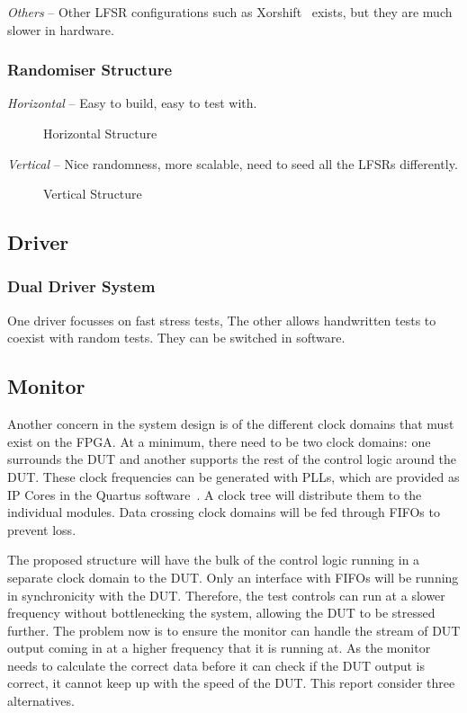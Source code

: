 \textit{Others} --
Other LFSR configurations such as Xorshift~\cite{Marsaglia1} exists, but they are much slower in hardware.

\subsubsection{Randomiser Structure}

\textit{Horizontal} --
Easy to build, easy to test with.

\begin{figure}[ht]
  \centering
  
  \caption{Horizontal Structure}
  \label{HoriLFSR}
\end{figure}

\textit{Vertical} --
Nice randomness, more scalable, need to seed all the LFSRs differently.

\begin{figure}[ht]
  \centering
  
  \caption{Vertical Structure}
  \label{VertLFSR}
\end{figure}

\subsection{Driver}
\subsubsection{Dual Driver System}
One driver focusses on fast stress tests, The other allows handwritten tests to coexist with random tests.
They can be switched in software.

\subsection{Monitor}

Another concern in the system design is of the different clock domains that must exist on the FPGA.
At a minimum, there need to be two clock domains: one surrounds the DUT and another supports the rest of the control logic around the DUT.
These clock frequencies can be generated with PLLs, which are provided as IP Cores in the Quartus software~\cite{Altera4}.
A clock tree will distribute them to the individual modules.
Data crossing clock domains will be fed through FIFOs to prevent loss.

The proposed structure will have the bulk of the control logic running in a separate clock domain to the DUT.
Only an interface with FIFOs will be running in synchronicity with the DUT.
Therefore, the test controls can run at a slower frequency without bottlenecking the system, allowing the DUT to be stressed further.
The problem now is to ensure the monitor can handle the stream of DUT output coming in at a higher frequency that it is running at.
As the monitor needs to calculate the correct data before it can check if the DUT output is correct, it cannot keep up with the speed of the DUT.
This report consider three alternatives.

